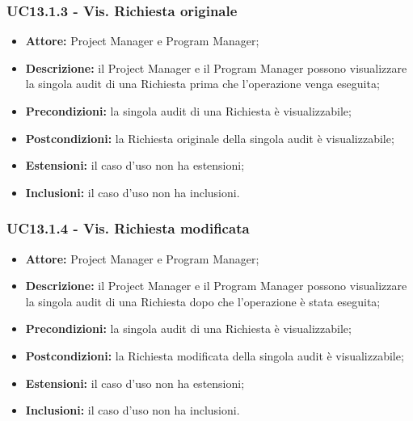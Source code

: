 \subsubsection*{UC13.1.3 - Vis. Richiesta originale}
\begin{itemize}[label=$\circ$]
\item \textbf{Attore:} Project Manager e Program Manager;
\item \textbf{Descrizione:} il Project Manager e il Program Manager possono visualizzare la singola audit di una Richiesta prima che l'operazione venga eseguita;
\item \textbf{Precondizioni:} la singola audit di una Richiesta è visualizzabile;
\item \textbf{Postcondizioni:} la Richiesta originale della singola audit è visualizzabile;
\item \textbf{Estensioni:} il caso d'uso non ha estensioni;
\item \textbf{Inclusioni:} il caso d'uso non ha inclusioni.
\end{itemize}

\subsubsection*{UC13.1.4 - Vis. Richiesta modificata}
\begin{itemize}[label=$\circ$]
\item \textbf{Attore:} Project Manager e Program Manager;
\item \textbf{Descrizione:} il Project Manager e il Program Manager possono visualizzare la singola audit di una Richiesta dopo che l'operazione è stata eseguita;
\item \textbf{Precondizioni:} la singola audit di una Richiesta è visualizzabile;
\item \textbf{Postcondizioni:} la Richiesta modificata della singola audit è visualizzabile;
\item \textbf{Estensioni:} il caso d'uso non ha estensioni;
\item \textbf{Inclusioni:} il caso d'uso non ha inclusioni.
\end{itemize}

